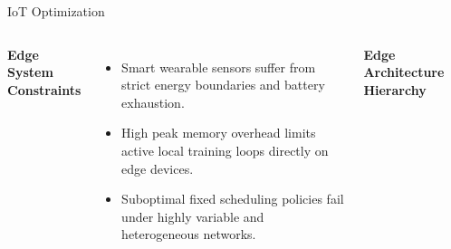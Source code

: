 \documentclass[10pt, aspectratio=169]{beamer}
\begin{document}
\begin{frame}{IoT Optimization}
    \begin{columns}[T]
        \textbf{Edge System Constraints}
        \begin{itemize}
            \item Smart wearable sensors suffer from strict energy boundaries and battery exhaustion.
            \item High peak memory overhead limits active local training loops directly on edge devices.
            \item Suboptimal fixed scheduling policies fail under highly variable and heterogeneous networks.
        \end{itemize}

        \centering
        \textbf{Edge Architecture Hierarchy}
        \vspace{0.2cm}

        \begin{center}
            \setlength{\fboxrule}{0.5pt}
        \end{center}
    \end{columns}
\end{frame}
\end{document}
